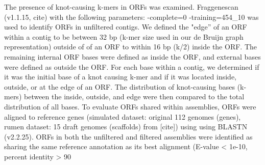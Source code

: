 \documentclass[11pt]{article} %
\begin{document}
The presence of knot-causing k-mers in ORFs was examined. Fraggenescan
(v1.1.15, cite) with the following parameters: -complete=0 -training=454\_10
was used to identify ORFs in unfiltered contigs. We defined the "edge''
of an ORF within a contig to be between 32 bp (k-mer size used in
our de Bruijn graph representation) outside of of an ORF to within
16 bp (k/2) inside the ORF. The remaining internal ORF bases were
defined as inside the ORF, and external bases were defined as outside
the ORF. For each base within a contig, we determined if it was the
initial base of a knot causing k-mer and if it was located inside, outside,
or at the edge of an ORF. The distribution of knot-causing bases (k-mers)
between the inside, outside, and edge were then compared to the total
distribution of all bases.  To evaluate ORFs shared within assemblies, ORFs were aligned to reference genes (simulated dataset:  original 112 genomes (genes), rumen dataset: 15 draft genomes (scaffolds) from [cite]) using using BLASTN (v2.2.25).  ORFs in both the unfiltered and filtered assemblies were identified as sharing the same reference annotation as its best alignment (E-value < 1e-10, percent identity > 90%
	
	





\end{document}
